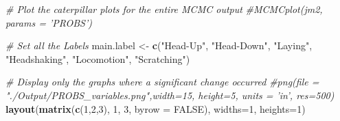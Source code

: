 \documentclass[]{article}
\newenvironment{Shaded}{\begin{snugshade}}{\end{snugshade}}
\newcommand{\CommentTok}[1]{\textcolor[rgb]{0.56,0.35,0.01}{\textit{#1}}}
\newcommand{\DataTypeTok}[1]{\textcolor[rgb]{0.13,0.29,0.53}{#1}}
\newcommand{\DecValTok}[1]{\textcolor[rgb]{0.00,0.00,0.81}{#1}}
\newcommand{\KeywordTok}[1]{\textcolor[rgb]{0.13,0.29,0.53}{\textbf{#1}}}
\newcommand{\NormalTok}[1]{#1}
\newcommand{\OtherTok}[1]{\textcolor[rgb]{0.56,0.35,0.01}{#1}}
\newcommand{\StringTok}[1]{\textcolor[rgb]{0.31,0.60,0.02}{#1}}
\begin{document}
\begin{Shaded}
\begin{Highlighting}[]
\CommentTok{# Plot the caterpillar plots for the entire MCMC output}
\CommentTok{#MCMCplot(jm2, params = 'PROBS')}

\CommentTok{# Set all the Labels}
\NormalTok{main.label <-}\StringTok{ }\KeywordTok{c}\NormalTok{(}\StringTok{"Head-Up"}\NormalTok{, }\StringTok{"Head-Down"}\NormalTok{, }\StringTok{"Laying"}\NormalTok{, }\StringTok{"Headshaking"}\NormalTok{, }\StringTok{"Locomotion"}\NormalTok{, }\StringTok{"Scratching"}\NormalTok{)}

\CommentTok{# Display only the graphs where a significant change occurred}
\CommentTok{#png(file = "./Output/PROBS_variables.png",width=15, height=5, units = 'in', res=500)}
\KeywordTok{layout}\NormalTok{(}\KeywordTok{matrix}\NormalTok{(}\KeywordTok{c}\NormalTok{(}\DecValTok{1}\NormalTok{,}\DecValTok{2}\NormalTok{,}\DecValTok{3}\NormalTok{), }\DecValTok{1}\NormalTok{, }\DecValTok{3}\NormalTok{, }\DataTypeTok{byrow =} \OtherTok{FALSE}\NormalTok{), }\DataTypeTok{widths=}\DecValTok{1}\NormalTok{, }\DataTypeTok{heights=}\DecValTok{1}\NormalTok{)}


\end{Highlighting}
\end{Shaded}
\end{document}
